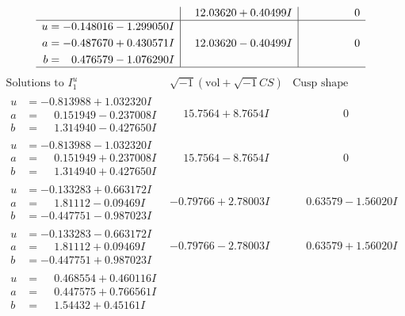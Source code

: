 \documentclass[1p]{elsarticle_modified}
\theoremstyle{definition}
\newcommand{\I}{\sqrt{-1}}
\begin{document}
$$\begin{array}{c|c|c}
 & \phantom{-}12.03620 + 0.40499 I & \phantom{-0.000000 } 0 \\ \hline\begin{aligned}
u &= -0.148016 - 1.299050 I \\
a &= -0.487670 + 0.430571 I \\
b &= \phantom{-}0.476579 - 1.076290 I\end{aligned}
 & \phantom{-}12.03620 - 0.40499 I & \phantom{-0.000000 } 0\\
 \hline 
 \end{array}$$\newpage$$\begin{array}{c|c|c}  
\text{Solutions to }I^u_{1}& \I (\text{vol} + \sqrt{-1}CS) & \text{Cusp shape}\\
 \hline 
\begin{aligned}
u &= -0.813988 + 1.032320 I \\
a &= \phantom{-}0.151949 - 0.237008 I \\
b &= \phantom{-}1.314940 - 0.427650 I\end{aligned}
 & \phantom{-}15.7564 + 8.7654 I & \phantom{-0.000000 } 0 \\ \hline\begin{aligned}
u &= -0.813988 - 1.032320 I \\
a &= \phantom{-}0.151949 + 0.237008 I \\
b &= \phantom{-}1.314940 + 0.427650 I\end{aligned}
 & \phantom{-}15.7564 - 8.7654 I & \phantom{-0.000000 } 0 \\ \hline\begin{aligned}
u &= -0.133283 + 0.663172 I \\
a &= \phantom{-}1.81112 - 0.09469 I \\
b &= -0.447751 - 0.987023 I\end{aligned}
 & -0.79766 + 2.78003 I & \phantom{-}0.63579 - 1.56020 I \\ \hline\begin{aligned}
u &= -0.133283 - 0.663172 I \\
a &= \phantom{-}1.81112 + 0.09469 I \\
b &= -0.447751 + 0.987023 I\end{aligned}
 & -0.79766 - 2.78003 I & \phantom{-}0.63579 + 1.56020 I \\ \hline\begin{aligned}
u &= \phantom{-}0.468554 + 0.460116 I \\
a &= \phantom{-}0.447575 + 0.766561 I \\
b &= \phantom{-}1.54432 + 0.45161 I\end{aligned}

\end{array}$$
\end{document}
